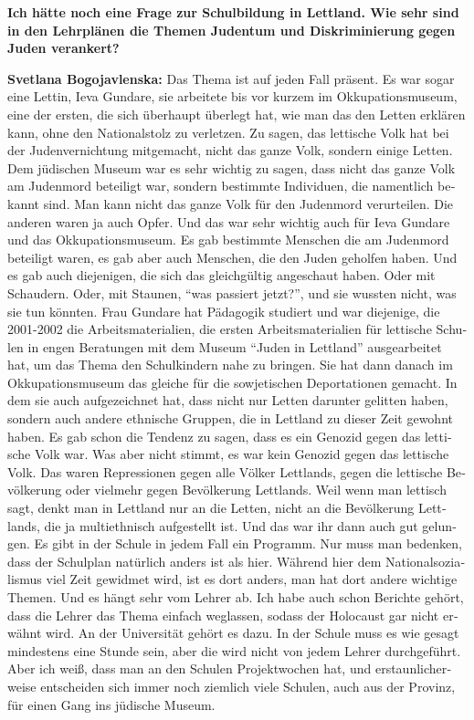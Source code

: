 \begin{otherlanguage}{ngerman}
\textbf{Ich hätte noch eine Frage zur Schulbildung in Lettland. Wie sehr sind in den Lehrplänen die Themen Judentum und Diskriminierung gegen Juden verankert?}

\textbf{Svetlana Bogojavlenska:} Das Thema ist auf jeden Fall präsent. Es war sogar eine Lettin, Ieva Gundare, sie arbeitete bis vor kurzem im Okkupationsmuseum, eine der ersten, die sich überhaupt überlegt hat, wie man das den Letten erklären kann, ohne den Nationalstolz zu verletzen. Zu sagen, das lettische Volk hat bei der Judenvernichtung mitgemacht, nicht das ganze Volk, sondern einige Letten. Dem jüdischen Museum war es sehr wichtig zu sagen, dass nicht das ganze Volk am Judenmord beteiligt war, sondern bestimmte Individuen, die namentlich bekannt sind. Man kann nicht das ganze Volk für den Judenmord verurteilen. Die anderen waren ja auch Opfer. Und das war sehr wichtig auch für Ieva Gundare und das Okkupationsmuseum. Es gab bestimmte Menschen die am Judenmord beteiligt waren, es gab aber auch Menschen, die den Juden geholfen haben. Und es gab auch diejenigen, die sich das gleichgültig angeschaut haben. Oder mit Schaudern. Oder, mit Staunen, "`was passiert jetzt?"', und sie wussten nicht, was sie tun könnten. Frau Gundare hat Pädagogik studiert und war diejenige, die 2001-2002 die Arbeitsmaterialien, die ersten Arbeitsmaterialien für lettische Schulen in engen Beratungen mit dem Museum "`Juden in Lettland"' ausgearbeitet hat, um das Thema den Schulkindern nahe zu bringen. Sie hat dann danach im Okkupationsmuseum das gleiche für die sowjetischen Deportationen gemacht. In dem sie auch aufgezeichnet hat, dass nicht nur Letten darunter gelitten haben, sondern auch andere ethnische Gruppen, die in Lettland zu dieser Zeit gewohnt haben.
Es gab schon die Tendenz zu sagen, dass es ein Genozid gegen das lettische Volk war. Was aber nicht stimmt, es war kein Genozid gegen das lettische Volk. Das waren Repressionen gegen alle Völker Lettlands, gegen die lettische Bevölkerung oder vielmehr gegen Bevölkerung Lettlands. Weil wenn man lettisch sagt, denkt man in Lettland nur an die Letten, nicht an die Bevölkerung Lettlands, die ja multiethnisch aufgestellt ist. Und das war ihr dann auch gut gelungen.
Es gibt in der Schule in jedem Fall ein Programm. Nur muss man bedenken, dass der Schulplan natürlich anders ist als hier. Während hier dem Nationalsozialismus viel Zeit gewidmet wird, ist es dort anders, man hat dort andere wichtige Themen. Und es hängt sehr vom Lehrer ab. Ich habe auch schon Berichte gehört, dass die Lehrer das Thema einfach weglassen, sodass der Holocaust gar nicht erwähnt wird. An der Universität gehört es dazu. In der Schule muss es wie gesagt mindestens eine Stunde sein, aber die wird nicht von jedem Lehrer durchgeführt. Aber ich weiß, dass man an den Schulen Projektwochen hat, und erstaunlicherweise entscheiden sich immer noch ziemlich viele Schulen, auch aus der Provinz, für einen Gang ins jüdische Museum.
\end{otherlanguage}